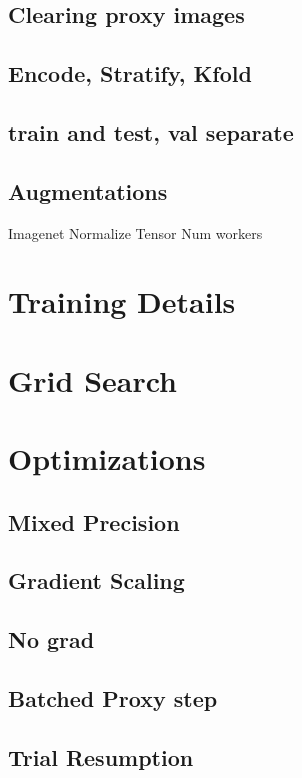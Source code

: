 \subsection{Clearing proxy images}

\subsection{Encode, Stratify, Kfold}

\subsection{train and test, val separate}

\subsection{Augmentations}
Imagenet Normalize
Tensor
Num workers

\section{Training Details}

\section{Grid Search}

\section{Optimizations}
\subsection{Mixed Precision}
\subsection{Gradient Scaling}
\subsection{No grad}
\subsection{Batched Proxy step}
\subsection{Trial Resumption}



